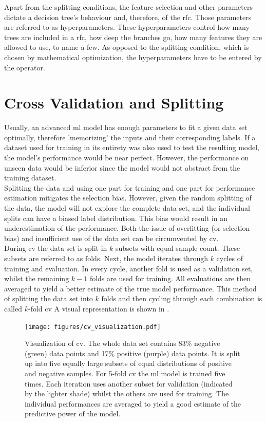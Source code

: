 Apart from the splitting conditions, the feature selection and other parameters dictate a decision tree's behaviour and, therefore, of the \ac{rfc}. Those parameters are referred to as hyperparameters. These hyperparameters control how many trees are included in a \ac{rfc}, how deep the branches go, how many features they are allowed to use, to name a few.\cite{Pedregosa2012} As opposed to the splitting condition, which is chosen by mathematical optimization, the hyperparameters have to be entered by the operator.\cite{Forsyth2019}
%
%
\section{Cross Validation and Splitting}\label{sec:cv}
Usually, an advanced \ac{ml} model has enough parameters to fit a given data set optimally, therefore 'memorizing' the inputs and their corresponding labels. If a dataset used for training in its entirety was also used to test the resulting model, the model's performance would be near perfect. However, the
performance on unseen data would be inferior since the model would not abstract from the training dataset.\cite{Raschka2018}\\
Splitting the data and using one part for training and one part for performance estimation mitigates the selection bias. However, given the random splitting of the data, the model will not explore the complete data set, and the individual splits can have a biased label distribution. This bias would result in an underestimation of the performance. Both the issue of overfitting (or selection bias) and insufficient use of the data set can be circumvented by \ac{cv}.\cite{Forsyth2019}\\
During \ac{cv} the data set is split in $k$ subsets with equal sample count. These subsets are referred to as folds. Next, the model iterates through $k$ cycles of training and evaluation. In every cycle, another fold is used as a validation set, whilst the remaining $k-1$ folds are used for training. All evaluations are then averaged to yield a better estimate of the true model performance. This method of splitting the data set into $k$ folds and then cycling through each combination is called $k$-fold \ac{cv}\cite{Raschka2018} A visual representation is shown in .\\
\begin{figure}[H]
	\centering
	\texttt{[image: figures/cv\_visualization.pdf]}
	\caption[Visualization of \ac{cv}]{Visualization of \ac{cv}. The whole data set contains 83\% negative (green) data points and 17\% positive (purple) data points. It is split up into five equally large subsets of equal distributions of positive and negative samples. For 5-fold \ac{cv} the \ac{ml} model is trained five times. Each iteration uses another subset for validation (indicated by the lighter shade) whilst the others are used for training. The individual performances are averaged to yield a good estimate of the predictive power of the model.}
	\label{fig:cv}
\end{figure}
